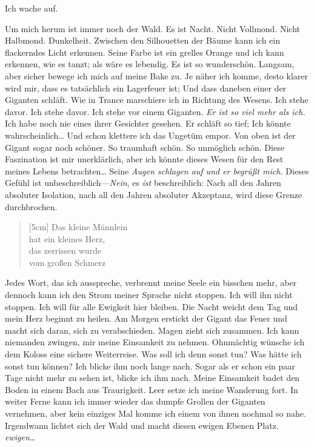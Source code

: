 \documentclass{article}
\begin{document}
	Ich wache auf.  
	
	Um mich herum ist immer noch der Wald. Es ist Nacht. Nicht Vollmond. Nicht Halbmond. Dunkelheit. Zwischen den Silhouetten der Bäume kann ich ein flackerndes Licht erkennen. Seine Farbe ist ein grelles Orange und ich kann erkennen, wie es tanzt; als wäre es lebendig. Es ist so wunderschön. Langsam, aber sicher bewege ich mich auf meine Bake zu. Je näher ich komme, desto klarer wird mir, dass es tatsächlich ein Lagerfeuer ist; Und dass daneben einer der Giganten schläft. Wie in Trance marschiere ich in Richtung des Wesens. Ich stehe davor. Ich stehe davor. Ich stehe vor einem Giganten. \textit{Er ist so viel mehr als ich.} Ich habe noch nie eines ihrer Gesichter gesehen. Er schläft so tief; Ich könnte wahrscheinlich… Und schon klettere ich das Ungetüm empor. Von oben ist der Gigant sogar noch schöner. So traumhaft schön. So unmöglich schön. Diese Faszination ist mir unerklärlich, aber ich könnte dieses Wesen für den Rest meines Lebens betrachten… Seine \textit{Augen schlagen auf und er begrüßt mich.} Dieses Gefühl ist unbeschreiblich—\textit{Nein}, es \textit{ist} beschreiblich: Nach all den Jahren absoluter Isolation, nach all den Jahren absoluter Akzeptanz, wird diese Grenze durchbrochen.  
	
	\begin{verse}[5cm]
		Das kleine Männlein \\ 
		hat ein kleines Herz, \\  
		das zerrissen wurde \\
		vom großen Schmerz
	\end{verse}
	
	Jedes Wort, das ich ausspreche, verbrennt meine Seele ein bisschen mehr, aber dennoch kann ich den Strom meiner Sprache nicht stoppen. Ich will ihn nicht stoppen. Ich will für alle Ewigkeit hier bleiben. Die Nacht weicht dem Tag und mein Herz beginnt zu heilen. Am Morgen erstickt der Gigant das Feuer und macht sich daran, sich zu verabschieden. Magen zieht sich zusammen. Ich kann niemanden zwingen, mir meine Einsamkeit zu nehmen. Ohnmächtig wünsche ich dem Koloss eine sichere Weiterreise. Was soll ich denn sonst tun? Was hätte ich sonst tun können? Ich blicke ihm noch lange nach. Sogar als er schon ein paar Tage nicht mehr zu sehen ist, blicke ich ihm nach. Meine Einsamkeit badet den Boden in einem Bach aus Traurigkeit. Leer setze ich meine Wanderung fort. In weiter Ferne kann ich immer wieder das dumpfe Grollen der Giganten vernehmen, aber kein einziges Mal komme ich einem von ihnen nochmal so nahe. Irgendwann lichtet sich der Wald und macht diesen ewigen Ebenen Platz. \textit{ewigen\dots}
	
\end{document}
